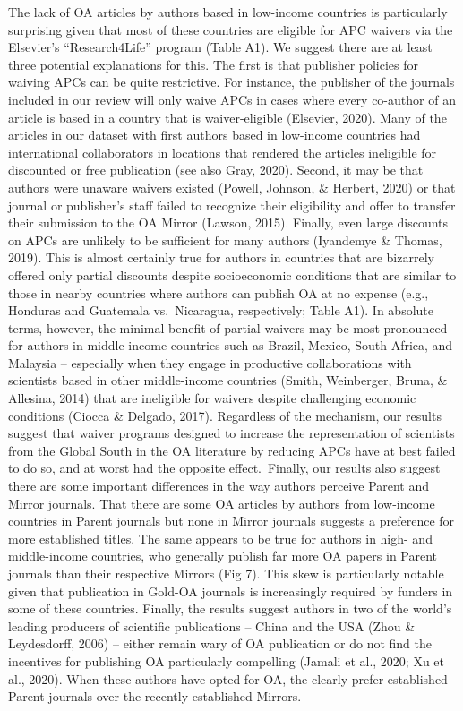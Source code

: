 \documentclass[
  english,
  man]{apa6}
\begin{document}
The lack of OA articles by authors based in low-income countries is particularly surprising given that most of these countries are eligible for APC waivers via the Elsevier's ``Research4Life'' program (Table A1). We suggest there are at least three potential explanations for this. The first is that publisher policies for waiving APCs can be quite restrictive. For instance, the publisher of the journals included in our review will only waive APCs in cases where every co-author of an article is based in a country that is waiver-eligible (Elsevier, 2020). Many of the articles in our dataset with first authors based in low-income countries had international collaborators in locations that rendered the articles ineligible for discounted or free publication (see also Gray, 2020). Second, it may be that authors were unaware waivers existed (Powell, Johnson, \& Herbert, 2020) or that journal or publisher's staff failed to recognize their eligibility and offer to transfer their submission to the OA Mirror (Lawson, 2015). Finally, even large discounts on APCs are unlikely to be sufficient for many authors (Iyandemye \& Thomas, 2019). This is almost certainly true for authors in countries that are bizarrely offered only partial discounts despite socioeconomic conditions that are similar to those in nearby countries where authors can publish OA at no expense (e.g., Honduras and Guatemala vs.~Nicaragua, respectively; Table A1). In absolute terms, however, the minimal benefit of partial waivers may be most pronounced for authors in middle income countries such as Brazil, Mexico, South Africa, and Malaysia -- especially when they engage in productive collaborations with scientists based in other middle-income countries (Smith, Weinberger, Bruna, \& Allesina, 2014) that are ineligible for waivers despite challenging economic conditions (Ciocca \& Delgado, 2017). Regardless of the mechanism, our results suggest that waiver programs designed to increase the representation of scientists from the Global South in the OA literature by reducing APCs have at best failed to do so, and at worst had the opposite effect.~Finally, our results also suggest there are some important differences in the way authors perceive Parent and Mirror journals. That there are some OA articles by authors from low-income countries in Parent journals but none in Mirror journals suggests a preference for more established titles. The same appears to be true for authors in high- and middle-income countries, who generally publish far more OA papers in Parent journals than their respective Mirrors (Fig 7). This skew is particularly notable given that publication in Gold-OA journals is increasingly required by funders in some of these countries. Finally, the results suggest authors in two of the world's leading producers of scientific publications -- China and the USA (Zhou \& Leydesdorff, 2006) -- either remain wary of OA publication or do not find the incentives for publishing OA particularly compelling (Jamali et al., 2020; Xu et al., 2020). When these authors have opted for OA, the clearly prefer established Parent journals over the recently established Mirrors.
\end{document}
